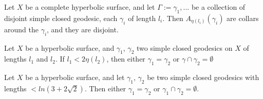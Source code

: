 \begin{thm}
Let $X$ be a complete hyperbolic surface, and let $\Gamma:={\gamma_1,...}$ be a collection of disjoint simple closed geodesic, each $\gamma_i$ of length $l_i$. Then $A_{\eta(l_i)}(\gamma_i)$ are collars around the $\gamma_i$, and they are disjoint.
\end{thm}

\begin{cor}
Let $X$ be a hyperbolic surface, and $\gamma_1$, $\gamma_2$ two simple closed geodesics on $X$ of lengths $l_1$ and $l_2$. If $l_1 < 2 \eta(l_2)$, then either $\gamma_1=\gamma_2$ or $\gamma \cap \gamma_2 = \emptyset$
\end{cor}

\begin{cor}
Let $X$ be a hyperbolic surface, and let $\gamma_1$, $\gamma_2$ be two simple closed geodesics with lengths $< ln(3+2 \sqrt{2})$. Then either $\gamma_1=\gamma_2$ or $\gamma_1 \cap \gamma_2 = \emptyset$.
\end{cor}


